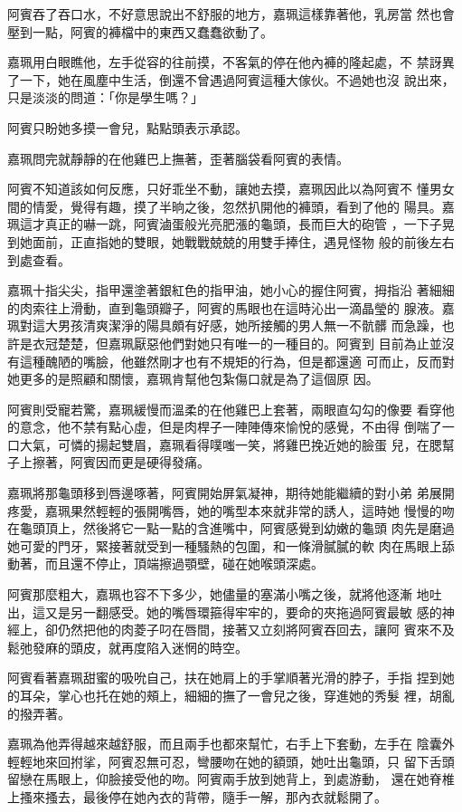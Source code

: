 阿賓吞了吞口水，不好意思說出不舒服的地方，嘉珮這樣靠著他，乳房當
然也會壓到一點，阿賓的褲檔中的東西又蠢蠢欲動了。

嘉珮用白眼瞧他，左手從容的往前摸，不客氣的停在他內褲的隆起處，不
禁訝異了一下，她在風塵中生活，倒還不曾遇過阿賓這種大傢伙。不過她也沒
說出來，只是淡淡的問道：「你是學生嗎？」

阿賓只盼她多摸一會兒，點點頭表示承認。

嘉珮問完就靜靜的在他雞巴上撫著，歪著腦袋看阿賓的表情。

阿賓不知道該如何反應，只好乖坐不動，讓她去摸，嘉珮因此以為阿賓不
懂男女間的情愛，覺得有趣，摸了半晌之後，忽然扒開他的褲頭，看到了他的
陽具。嘉珮這才真正的嚇一跳，阿賓滷蛋般光亮肥漲的龜頭，長而巨大的砲管
，一下子晃到她面前，正直指她的雙眼，她戰戰兢兢的用雙手捧住，遇見怪物
般的前後左右到處查看。

嘉珮十指尖尖，指甲還塗著銀紅色的指甲油，她小心的握住阿賓，拇指沿
著細細的肉索往上滑動，直到龜頭瓣子，阿賓的馬眼也在這時沁出一滴晶瑩的
腺液。嘉珮對這大男孩清爽潔淨的陽具頗有好感，她所接觸的男人無一不骯髒
而急躁，也許是衣冠楚楚，但嘉珮厭惡他們對她只有唯一的一種目的。阿賓到
目前為止並沒有這種醜陋的嘴臉，他雖然剛才也有不規矩的行為，但是都還適
可而止，反而對她更多的是照顧和關懷，嘉珮肯幫他包紮傷口就是為了這個原
因。

阿賓則受寵若驚，嘉珮緩慢而溫柔的在他雞巴上套著，兩眼直勾勾的像要
看穿他的意念，他不禁有點心虛，但是肉桿子一陣陣傳來愉悅的感覺，不由得
倒喘了一口大氣，可憐的揚起雙眉，嘉珮看得噗嗤一笑，將雞巴挽近她的臉蛋
兒，在腮幫子上擦著，阿賓因而更是硬得發痛。

嘉珮將那龜頭移到唇邊啄著，阿賓開始屏氣凝神，期待她能繼續的對小弟
弟展開疼愛，嘉珮果然輕輕的張開嘴唇，她的嘴型本來就非常的誘人，這時她
慢慢的吻在龜頭頂上，然後將它一點一點的含進嘴中，阿賓感覺到幼嫩的龜頭
肉先是磨過她可愛的門牙，緊接著就受到一種騷熱的包圍，和一條滑膩膩的軟
肉在馬眼上舔動著，而且還不停止，頂端擦過顎壁，碰在她喉頭深處。

阿賓那麼粗大，嘉珮也容不下多少，她儘量的塞滿小嘴之後，就將他逐漸
地吐出，這又是另一翻感受。她的嘴唇環箍得牢牢的，要命的夾拖過阿賓最敏
感的神經上，卻仍然把他的肉菱子叼在唇間，接著又立刻將阿賓吞回去，讓阿
賓來不及鬆弛發麻的頭皮，就再度陷入迷惘的時空。

阿賓看著嘉珮甜蜜的吸吮自己，扶在她肩上的手掌順著光滑的脖子，手指
捏到她的耳朵，掌心也托在她的頰上，細細的撫了一會兒之後，穿進她的秀髮
裡，胡亂的撥弄著。

嘉珮為他弄得越來越舒服，而且兩手也都來幫忙，右手上下套動，左手在
陰囊外輕輕地來回拊挲，阿賓忍無可忍，彎腰吻在她的額頭，她吐出龜頭，只
留下舌頭留戀在馬眼上，仰臉接受他的吻。阿賓兩手放到她背上，到處游動，
還在她脊椎上搔來搔去，最後停在她內衣的背帶，隨手一解，那內衣就鬆開了。

